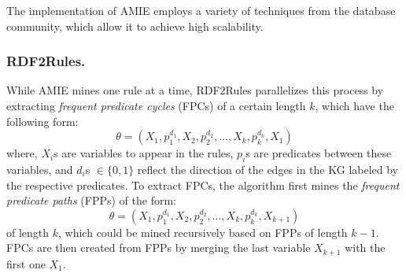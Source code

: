 
The implementation of AMIE employs a variety of techniques from the database community, which allow it to achieve high scalability.

\subsubsection{RDF2Rules.}
While AMIE mines one rule at a time, RDF2Rules \cite{rdf2rules} parallelizes this process by extracting \emph{frequent predicate cycles} (FPCs) of %
a certain length $k$, which have the following form:
\[\theta = (X_1, p_1^{d_1}, X_2, p_2^{d_2},\dotsc, X_k, p_k^{d_k}, X_1)\]
where, $X_i$s are variables to appear in the rules, $p_i$s are predicates between these variables, and $d_i$s $\in \{0,1\}$ reflect the direction of the edges in the KG labeled by the respective predicates. To extract FPCs, the algorithm first mines the \emph{frequent predicate paths} (FPPs) of the form:
\[\theta = (X_1, p_1^{d_1}, X_2, p_2^{d_2}, ...,X_k, p_k^{d_k}, X_{k+1})\]
of length $k$, which could be mined recursively based on FPPs of length $k-1$. 
FPCs are then created from FPPs by merging the last variable $X_{k+1}$ with the first one $X_1$.

